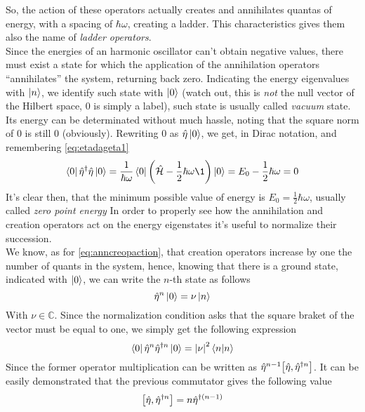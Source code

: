 \documentclass[../qm.tex]{subfiles}
\begin{document}
	So, the action of these operators actually creates and annihilates quantas of energy, with a spacing of $\hbar\omega$, creating a ladder. This characteristics gives them also the name of \textit{ladder operators}.\\
	Since the energies of an harmonic oscillator can't obtain negative values, there must exist a state for which the application of the annihilation operators ``annihilates'' the system, returning back zero. Indicating the energy eigenvalues with $\ket{n}$, we identify such state with $\ket{0}$ (watch out, this is \emph{not} the null vector of the Hilbert space, $0$ is simply a label), such state is usually called \textit{vacuum} state.\\
	Its energy can be determinated without much hassle, noting that the square norm of $0$ is still $0$ (obviously). Rewriting $0$ as $\hat{\eta}\ket{0}$, we get, in Dirac notation, and remembering \eqref{eq:etadageta1}
	\begin{equation}
		\bra{0}\adj{\opr{\eta}}\opr{\eta}\ket{0}=\frac{1}{\hbar\omega}\bra{0}\left( \opr{\ham}-\frac{1}{2}\hbar\omega\1 \right)\ket{0}=E_0-\frac{1}{2}\hbar\omega=0
		\label{eq:zeropointenergy}
	\end{equation}
	It's clear then, that the minimum possible value of energy is $E_0=\frac{1}{2}\hbar\omega$, usually called \textit{zero point energy}
	In order to properly see how the annihilation and creation operators act on the energy eigenstates it's useful to normalize their succession.\\
	We know, as for \eqref{eq:anncreopaction}, that creation operators increase by one the number of quants in the system, hence, knowing that there is a ground state, indicated with $\ket{0}$, we can write the $n$-th state as follows
	\begin{equation*}
		\hat{\eta}^n\ket{0}=\nu\ket{n}
	\end{equation*}
	With $\nu\in\mathbb{C}$. Since the normalization condition asks that the square braket of the vector must be equal to one, we simply get the following expression
	\begin{equation}
		\bra{0}\opr{\eta}^n\adj[n]{\opr{\eta}}\ket{0}=\abs{\nu}^2\braket{n}
		\label{eq:normcondqho}
	\end{equation}
	Since the former operator multiplication can be written as $\opr{\eta}^{n-1}\comm{\opr{\eta}}{\adj[n]{\opr{\eta}}}$. It can be easily demonstrated that the previous commutator gives the following value
	\begin{equation*}
		\comm{\opr{\eta}}{\adj[n]{\opr{\eta}}}=n\adj[(n-1)]{\opr{\eta}}
	\end{equation*}
\end{document}
